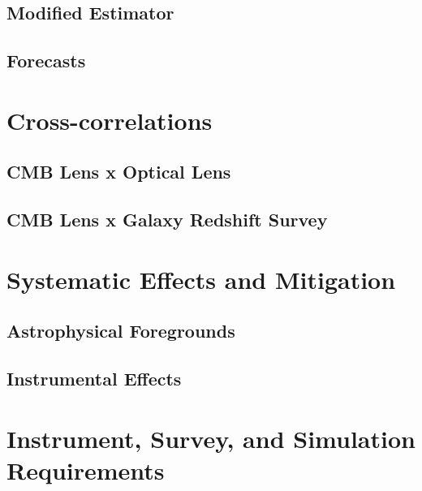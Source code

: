 \subsection{Modified Estimator}

\subsection{Forecasts}

\section{Cross-correlations}

\subsection{CMB Lens x Optical Lens}

\subsection{CMB Lens x Galaxy Redshift Survey}

\clearpage

\section{Systematic Effects and Mitigation}

\subsection{Astrophysical Foregrounds}

\subsection{Instrumental Effects}

\section{Instrument, Survey, and Simulation Requirements}




%



